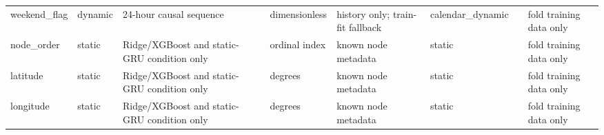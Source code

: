 \begin{longtable}{llllllll}
weekend\_flag & dynamic & 24-hour causal sequence & dimensionless & history only; train-fit fallback & calendar\_dynamic &  & fold training data only \\
node\_order & static & Ridge/XGBoost and static-GRU condition only & ordinal index & known node metadata & static &  & fold training data only \\
latitude & static & Ridge/XGBoost and static-GRU condition only & degrees & known node metadata & static &  & fold training data only \\
longitude & static & Ridge/XGBoost and static-GRU condition only & degrees & known node metadata & static &  & fold training data only \\
\end{longtable}
